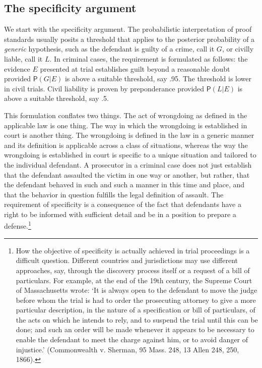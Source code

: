 \documentclass[
  10pt,
  dvipsnames,enabledeprecatedfontcommands]{scrartcl}
\newcommand{\pr}[1]{\ensuremath{\mathsf{P}(#1)}}
\begin{document}
\hypertarget{the-specificity-argument}{%
\subsection{The specificity argument}\label{the-specificity-argument}}

We start with the specificity argument. The probabilistic interpretation
of proof standards usually posits a threshold that applies to the
posterior probability of a \emph{generic} hypothesis, such as the
defendant is guilty of a crime, call it \(G\), or civilly liable, call
it \(L\). In criminal cases, the requirement is formulated as follows:
the evidence \(E\) presented at trial establishes guilt beyond a
reasonable doubt provided \(\pr{G \vert E}\) is above a suitable
threshold, say .95. The threshold is lower in civil trials. Civil
liability is proven by preponderance provided \(\pr{L \vert E}\) is
above a suitable threshold, say .5.

This formulation conflates two things. The act of wrongdoing as defined
in the applicable law is one thing. The way in which the wrongdoing is
established in court is another thing. The wrongdoing is defined in the
law in a generic manner and its definition is applicable across a class
of situations, whereas the way the wrongdoing is established in court is
specific to a unique situation and tailored to the individual defendant.
A prosecutor in a criminal case does not just establish that the
defendant assaulted the victim in one way or another, but rather, that
the defendant behaved in such and such a manner in this time and place,
and that the behavior in question fulfills the legal definition of
assault. The requirement of specificity is a consequence of the fact
that defendants have a right to be informed with sufficient detail and
be in a position to prepare a defense.\footnote{How the objective of
  specificity is actually achieved in trial proceedings is a difficult
  question. Different countries and jurisdictions may use different
  approaches, say, through the discovery process itself or a request of
  a bill of particulars. For example, at the end of the 19th century,
  the Supreme Court of Massachusetts wrote: `It is always open to the
  defendant to move the judge before whom the trial is had to order the
  prosecuting attorney to give a more particular description, in the
  nature of a specification or bill of particulars, of the acts on which
  he intends to rely, and to suspend the trial until this can be done;
  and such an order will be made whenever it appears to be necessary to
  enable the defendant to meet the charge against him, or to avoid
  danger of injustice.' (Commonwealth v. Sherman, 95 Mass. 248, 13 Allen
  248, 250, 1866).}
\end{document}
